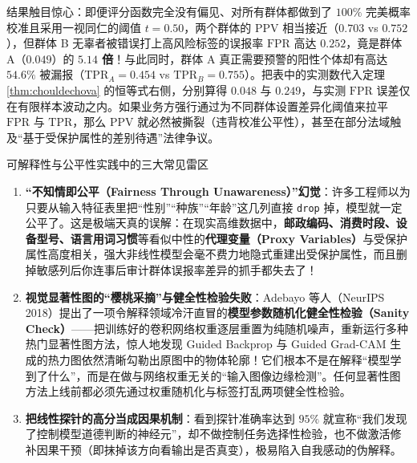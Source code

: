 结果触目惊心：即便评分函数完全没有偏见、对所有群体都做到了 $100\%$ 完美概率校准且采用一视同仁的阈值 $t=0.50$，两个群体的 $\mathrm{PPV}$ 相当接近（$0.703$ vs $0.752$），但群体 B 无辜者被错误打上高风险标签的误报率 $\mathrm{FPR}$ 高达 $0.252$，竟是群体 A（$0.049$）的 \textbf{$5.14$ 倍}！与此同时，群体 A 真正需要预警的阳性个体却有高达 $54.6\%$ 被漏报（$\mathrm{TPR}_A = 0.454$ vs $\mathrm{TPR}_B = 0.755$）。把表中的实测数代入定理 \ref{thm:chouldechova} 的恒等式右侧，分别算得 $0.048$ 与 $0.249$，与实测 $\mathrm{FPR}$ 误差仅在有限样本波动之内。如果业务方强行通过为不同群体设置差异化阈值来拉平 $\mathrm{FPR}$ 与 $\mathrm{TPR}$，那么 $\mathrm{PPV}$ 就必然被撕裂（违背校准公平性），甚至在部分法域触及“基于受保护属性的差别待遇”法律争议。

\begin{failBox}{可解释性与公平性实践中的三大常见雷区}
\begin{enumerate}
  \item \textbf{“不知情即公平（Fairness Through Unawareness）”幻觉}：许多工程师以为只要从输入特征表里把“性别”“种族”“年龄”这几列直接 \texttt{drop} 掉，模型就一定公平了。这是极端天真的误解：在现实高维数据中，\textbf{邮政编码、消费时段、设备型号、语言用词习惯}等看似中性的\textbf{代理变量（Proxy Variables）}与受保护属性高度相关，强大非线性模型会毫不费力地隐式重建出受保护属性，而且删掉敏感列后你连事后审计群体误报率差异的抓手都失去了！
  \item \textbf{视觉显著性图的“樱桃采摘”与健全性检验失败}：Adebayo 等人（NeurIPS 2018）提出了一项令解释领域冷汗直冒的\textbf{模型参数随机化健全性检验（Sanity Check）}——把训练好的卷积网络权重逐层重置为纯随机噪声，重新运行多种热门显著性图方法，惊人地发现 Guided Backprop 与 Guided Grad-CAM 生成的热力图依然清晰勾勒出原图中的物体轮廓！它们根本不是在解释“模型学到了什么”，而是在做与网络权重无关的“输入图像边缘检测”。任何显著性图方法上线前都必须先通过权重随机化与标签打乱两项健全性检验。
  \item \textbf{把线性探针的高分当成因果机制}：看到探针准确率达到 $95\%$ 就宣称“我们发现了控制模型道德判断的神经元”，却不做控制任务选择性检验，也不做激活修补因果干预（即抹掉该方向看输出是否真变），极易陷入自我感动的伪解释。
\end{enumerate}
\end{failBox}

